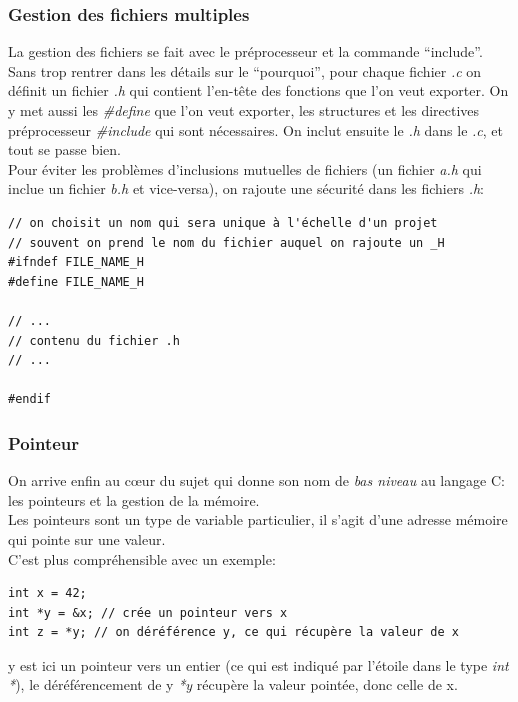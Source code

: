 \documentclass[a4paper,10pt]{article} %
\begin{document}
\subsubsection{Gestion des fichiers multiples}
La gestion des fichiers se fait avec le préprocesseur et la commande ``include''.\\

Sans trop rentrer dans les détails sur le ``pourquoi'', pour chaque fichier \textit{.c} on définit un fichier \textit{.h} qui contient l'en-tête des fonctions que l'on veut exporter. On y met aussi les \textit{\#define} que l'on veut exporter, les structures et les directives préprocesseur \textit{\#include} qui sont nécessaires. On inclut ensuite le \textit{.h} dans le \textit{.c}, et tout se passe bien.\\

Pour éviter les problèmes d'inclusions mutuelles de fichiers (un fichier \textit{a.h} qui inclue un fichier \textit{b.h} et vice-versa), on rajoute une sécurité dans les fichiers \textit{.h}:

\begin{lstlisting}[frame=single]
// on choisit un nom qui sera unique à l'échelle d'un projet
// souvent on prend le nom du fichier auquel on rajoute un _H
#ifndef FILE_NAME_H
#define FILE_NAME_H

// ...
// contenu du fichier .h
// ...

#endif
\end{lstlisting}

\subsubsection{Pointeur}
On arrive enfin au cœur du sujet qui donne son nom de \textit{bas niveau} au langage C: les pointeurs et la gestion de la mémoire.\\

Les pointeurs sont un type de variable particulier, il s'agit d'une adresse mémoire qui pointe sur une valeur.\\

C'est plus compréhensible avec un exemple:

\begin{lstlisting}[frame=single]
int x = 42;
int *y = &x; // crée un pointeur vers x
int z = *y; // on déréférence y, ce qui récupère la valeur de x
\end{lstlisting}

y est ici un pointeur vers un entier (ce qui est indiqué par l'étoile dans le type \textit{int *}), le déréférencement de y \textit{*y} récupère la valeur pointée, donc celle de x.\\
\end{document}
